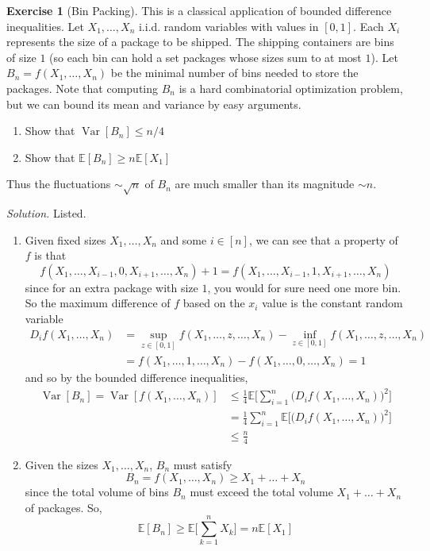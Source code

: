 \documentclass{article}
\DeclareMathOperator{\Var}{Var}
\theoremstyle{definition}
\newtheorem{exercise}{Exercise}[section]
\theoremstyle{remark}
\theoremstyle{definition}
\newenvironment{solution}{\noindent \textit{Solution.}}{}
\begin{document}
\begin{exercise}[Bin Packing]
This is a classical application of bounded difference inequalities. Let $X_1, \ldots, X_n$ i.i.d. random variables with values in $[0, 1]$. Each $X_i$ represents the size of a package to be shipped. The shipping containers are bins of size $1$ (so each bin can hold a set packages whose sizes sum to at most $1$). Let $B_n = f(X_1, \ldots, X_n)$ be the minimal number of bins needed to store the packages. Note that computing $B_n$ is a hard combinatorial optimization problem, but we can bound its mean and variance by easy arguments. 
\begin{enumerate}
    \item Show that $\Var[B_n] \leq n/4$
    \item Show that $\mathbb{E}[B_n] \geq n \mathbb{E}[X_1]$
\end{enumerate}
Thus the fluctuations $\sim \sqrt{n}$ of $B_n$ are much smaller than its magnitude $\sim n$. 
\end{exercise}
\begin{solution}
Listed. 
\begin{enumerate}
    \item Given fixed sizes $X_1, \ldots, X_n$ and some $i \in [n]$, we can see that a property of $f$ is that 
    \[f(X_1, \ldots, X_{i-1}, 0, X_{i+1}, \ldots, X_n) + 1 = f(X_1, \ldots, X_{i-1}, 1, X_{i+1}, \ldots, X_n)\]
    since for an extra package with size $1$, you would for sure need one more bin. So the maximum difference of $f$ based on the $x_i$ value is the constant random variable 
    \begin{align*}
        D_i f(X_1, \ldots, X_n) & = \sup_{z \in [0, 1]} f(X_1, \ldots, z, \ldots, X_n) - \inf_{z \in [0, 1]} f(X_1, \ldots, z, \ldots, X_n)\\
        & = f(X_1, \ldots, 1, \ldots, X_n) - f(X_1, \ldots, 0, \ldots, X_n) = 1
    \end{align*}
    and so by the bounded difference inequalities, 
    \begin{align*}
        \Var[B_n] = \Var[f(X_1, \ldots, X_n)] & \leq \frac{1}{4} \mathbb{E} \bigg[ \sum_{i=1}^n \big( D_i f(X_1, \ldots, X_n) \big)^2 \bigg] \\
        & = \frac{1}{4} \sum_{i=1}^n \mathbb{E} \big[ \big( D_i f(X_1, \ldots, X_n) \big)^2 \big] \\
        & \leq \frac{n}{4} 
    \end{align*}
    \item Given the sizes $X_1, \ldots, X_n$, $B_n$ must satisfy 
    \[B_n = f(X_1, \ldots, X_n) \geq X_1 + \ldots + X_n\] 
    since the total volume of bins $B_n$ must exceed the total volume $X_1 + \ldots + X_n$ of packages. So, 
    \[\mathbb{E}[B_n] \geq \mathbb{E}\bigg[ \sum_{k=1}^n X_k \bigg] = n \mathbb{E}[X_1]\]
\end{enumerate}
\end{solution}
\end{document}
